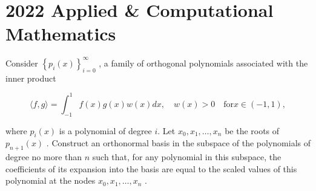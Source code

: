 \section{2022 Applied \& Computational Mathematics}

\begin{exercise}
\label{applied:2022:1}
Consider $\left\{ p _ { i } ( x ) \right\} _ { i = 0 } ^ { \infty }$ , a family of orthogonal polynomials associated with the inner product

\[
\langle f, g \rangle = \int_ {- 1} ^ {1} f (x) g (x) w (x) d x, \quad w (x) > 0 \quad \mathrm {f o r} x \in (- 1, 1),
\]

where $p _ { i } ( x )$ is a polynomial of degree $i$. Let $x _ { 0 } , x _ { 1 } , \ldots , x _ { n }$ be the roots of $p _ { n + 1 } ( x )$ . Construct an orthonormal basis in the subspace of the polynomials of degree no more than $n$ such that, for any polynomial in this subspace, the coefficients of its expansion into the basis are equal to the scaled values of this polynomial at the nodes $x _ { 0 } , x _ { 1 } , \ldots , x _ { n }$ .
\end{exercise}


